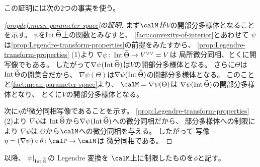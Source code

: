 \documentclass[report]{jlreq}
\begin{document}
この証明には次の2つの事実を使う。



\begin{proof}[\cref{propdef:mean-parameter-space}の証明]
    まず$\calM$が$V$の開部分多様体となることを示す。
    $\psi$を$\operatorname{Int} \widetilde{\Theta}$上の関数とみなすと、
    \cref{fact:convexity-of-interior}とあわせて
    $\psi$は\cref{prop:Legendre-transform-properties}の前提をみたすから、
    \cref{prop:Legendre-transform-properties} (1)より
    $\nabla \psi \colon \operatorname{Int} \widetilde{\Theta} \to V^{\vee\vee} = V$は
    局所微分同相、とくに開写像でもある。
    したがって$\nabla \psi(\operatorname{Int} \widetilde{\Theta})$は$V$の開部分多様体となる。
    さらに$\Theta$は$\operatorname{Int} \widetilde{\Theta}$の開集合だから、
    $\nabla \psi(\Theta)$は$\nabla \psi(\operatorname{Int} \widetilde{\Theta})$の開部分多様体となる。
    このことと\cref{fact:mean-parameter-space}より、
    $\calM = \nabla \psi(\Theta)$は
    $\nabla \psi(\operatorname{Int} \widetilde{\Theta})$の開部分多様体となり、
    とくに$V$の開部分多様体となる。

    次に$\eta$が微分同相写像であることを示す。
    \cref{prop:Legendre-transform-properties} (2)より
    $\nabla \psi$は
    $\operatorname{Int} \widetilde{\Theta}$から$\nabla \psi(\operatorname{Int} \widetilde{\Theta})$への微分同相だから、
    部分多様体への制限により
    $\nabla \psi$は
    $\Theta$から$\calM$への微分同相を与える。
    したがって
    写像$\eta = (\nabla \psi) \circ \theta \colon \calP \to \calM$は
    微分同相である。
\end{proof}

以降、
$\psi|_{\operatorname{Int} \widetilde{\Theta}}$の Legendre 変換を
$\calM$上に制限したものを$\phi$と記す。
\end{document}

